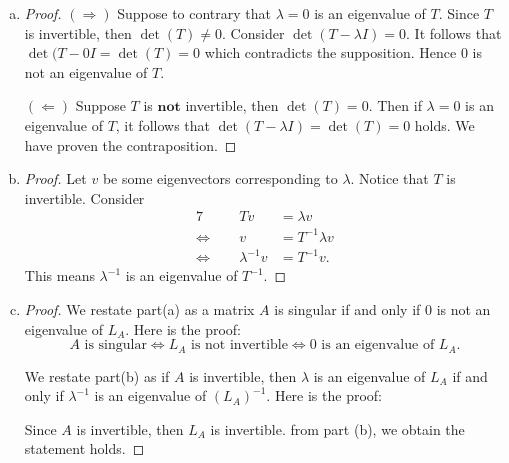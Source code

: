 \begin{Exercise}
	\begin{enumerate}[(a)]
		\item
		\begin{proof}
			$(\Longrightarrow)$
			Suppose to contrary that $\lambda = 0$ is an eigenvalue of $T$. Since $T$ is invertible, then $\det(T) \neq 0$. Consider  $\det(T-\lambda I) = 0$. It follows that $\det(T- 0 I = \det(T) = 0$ which contradicts the supposition. Hence $0$ is not an eigenvalue of $T$.
			
			\vspace{2ex}
			
			$(\Longleftarrow)$
			Suppose $T$ is $\mathbf{not}$ invertible, then $\det(T) = 0$. Then if $\lambda = 0$ is an eigenvalue of $T$, it follows that $\det(T-\lambda I) = \det(T) = 0$ holds. We have proven the contraposition.
		\end{proof}
		
		\item
		\begin{proof}
			Let $v$ be some eigenvectors corresponding to $\lambda$. Notice that $T$ is invertible. Consider
			\begin{alignat*}{7}
			\quad&& T v &= \lambda v \\
			\iff&& v &= T^{-1} \lambda v \\
			\iff&& \lambda^{-1} v &= T^{-1} v.
			\end{alignat*}
			This means $\lambda^{-1}$ is an eigenvalue of $T^{-1}$.
		\end{proof}
		
		\item
		\begin{proof}
			We restate part(a) as a matrix $A$ is singular if and only if $0$ is not an eigenvalue of $L_A$. Here is the proof:
			$$
			A\text{ is singular}
			\iff L_A\text{ is not invertible}
			\iff 0\text{ is an eigenvalue of } L_A.
			$$
			
			We restate part(b) as if $A$ is invertible, then $\lambda$ is an eigenvalue of $L_A$ if and only if $\lambda^{-1}$ is an eigenvalue of $(L_A)^{-1}$. Here is the proof:
			
			Since $A$ is invertible, then $L_A$ is invertible. from part (b), we obtain the statement holds.
		\end{proof}
	\end{enumerate}
\end{Exercise}
